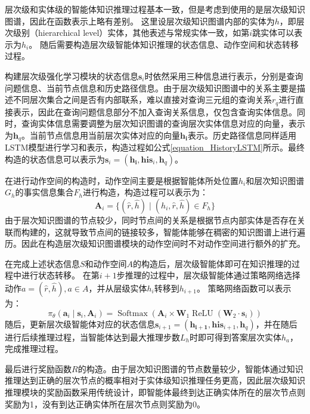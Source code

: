 \documentclass[algorithmlist, AutoFakeBold, AutoFakeSlant, figurelist, tablelist, nomlist, engineering]{seuthesix}
\begin{document}
层次级和实体级的智能体知识推理过程基本一致，但是考虑到使用的是层次级知识图谱，因此在函数表示上略有差别。
这里设层次级知识图谱内部的实体为$h$，即层次级别（hierarchical level）实体，其他表述与常规实体一致，如第$i$跳实体可以表示为$h_i$。
随后需要构造层次级智能体知识推理的状态信息、动作空间和状态转移过程。

构建层次级强化学习模块的状态信息$\bm{s}_i$时依然采用三种信息进行表示，分别是查询问题信息、当前节点信息和历史路径信息。由于层次级知识图谱中的关系主要是描述不同层次集合之间是否有内部联系，难以直接对查询三元组的查询关系$r_q$进行直接表示，因此在查询问题信息部分不加入查询关系信息，仅包含查询实体信息。同时，查询实体信息需要调整为层次知识图谱的查询层次实体信息对应的向量，表示为$\bm{h}_q$。当前节点信息用当前层次实体对应的向量$\bm{h_i}$表示。历史路径信息同样适用LSTM模型进行学习和表示，构造过程如公式\ref{equation_HistoryLSTM}所示。最终构造的状态信息可以表示为$\bm{s}_i = (\bm{h_i}, \bm{his}_i, \bm{h}_q)$。

在进行动作空间的构造时，动作空间主要是根据智能体所处位置$h_i$和层次知识图谱$G_h$的事实信息集合$F_h$进行构造，构造过程可以表示为：
\begin{equation}
  \bm{A}_i = \{(\hat{r}, \hat{h}) \mid (h_i, \hat{r}, \hat{h}) \in F_h\}
  \label{base_2}
\end{equation}
由于层次知识图谱的节点较少，同时节点间的关系是根据节点内部实体是否存在关联而构建的，这就导致节点间的链接较多，智能体能够在稠密的知识图谱上进行遍历。因此在构造层次级知识图谱模块的动作空间时不对动作空间进行额外的扩充。

在完成上述状态信息$S$和动作空间$A$的构造后，层次级智能体即可在知识推理的过程中进行状态转移。
在第$i+1$步推理的过程中，层次级智能体通过策略网络选择动作$a = (\hat{r}, \hat{h}), a \in A$，并从层级实体$h_i$转移到$h_{i+1}$。
策略网络函数可以表示为：
\begin{equation}
  \pi_\theta\left(\bm{a}_i \mid \bm{s}_i, \bm{A}_i\right) =\operatorname{Softmax}\left(\bm{A}_i \times \mathbf{W}_1 \operatorname{ReLU}\left(\mathbf{W}_2 \cdot \bm{s}_i\right)\right)
\end{equation}
随后，更新层次级智能体对应的状态信息$\bm{s}_{i+1} = (\bm{h_{i+1}}, \bm{his}_{i+1}, \bm{h}_q)$，并在随后进行后续推理过程，当智能体达到最大推理步数$L_h$时即可得到答案层次实体$h_a$，完成推理过程。

最后进行奖励函数$R$的构造。由于层次知识图谱的节点数量较少，智能体通过知识推理达到正确的层次节点的概率相对于实体级知识推理任务更高，因此层次级知识推理模块的奖励函数采用传统设计，即智能体最终到达正确实体所在的层次节点则奖励为1，没有到达正确实体所在层次节点则奖励为0。
\end{document}

